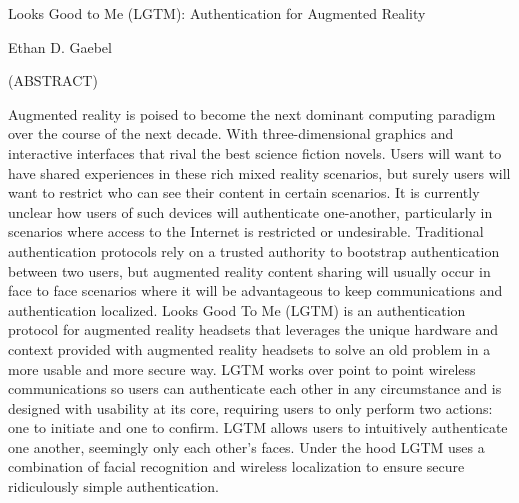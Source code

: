 \documentclass[12pt]{report}
\begin{document}
\thispagestyle{empty}
\begin{center}

{\large Looks Good to Me (LGTM): 
Authentication for Augmented Reality}

\vfill

Ethan D. Gaebel

\vfill

(ABSTRACT)


Augmented reality is poised to become the next dominant computing paradigm over the course of the next decade. With three-dimensional graphics and interactive interfaces that rival the best science fiction novels. Users will want to have shared experiences in these rich mixed reality scenarios, but surely users will want to restrict who can see their content in certain scenarios. It is currently unclear how users of such devices will authenticate one-another, particularly in scenarios where access to the Internet is restricted or undesirable. Traditional authentication protocols rely on a trusted authority to bootstrap authentication between two users, but augmented reality content sharing will usually occur in face to face scenarios where it will be advantageous to keep communications and authentication localized. Looks Good To Me (LGTM) is an authentication protocol for augmented reality headsets that leverages the unique hardware and context provided with augmented reality headsets to solve an old problem in a more usable and more secure way. LGTM works over point to point wireless communications so users can authenticate each other in any circumstance and is designed with usability at its core, requiring users to only perform two actions: one to initiate and one to confirm. LGTM allows users to intuitively authenticate one another, seemingly only each other's faces. Under the hood LGTM uses a combination of facial recognition and wireless localization to ensure secure ridiculously simple authentication.

\vfill

\end{center}
\end{document}
